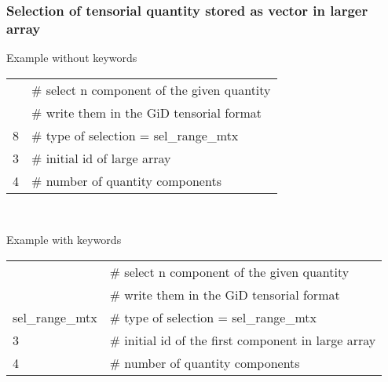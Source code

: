 \subsubsection{Selection of tensorial quantity stored as vector in larger array}
\noindent Example without keywords
\begin{center}
\begin{tabular}{|ll|}
\hline
   & \# select n component of the given quantity \\
   & \# write them in the GiD tensorial format   \\
8  & \# type of selection = sel\_range\_mtx      \\
3  & \# initial id of large array                \\
4  & \# number of quantity components            \\
\hline
\end{tabular}\\
\end{center}
Example with keywords
\begin{center}
\begin{tabular}{|ll|}
\hline
                & \# select n component of the given quantity         \\
                & \# write them in the GiD tensorial format           \\
sel\_range\_mtx & \# type of selection = sel\_range\_mtx              \\
3               & \# initial id of the first component in large array \\
4               & \# number of quantity components                    \\
\hline
\end{tabular}\\
\end{center}



